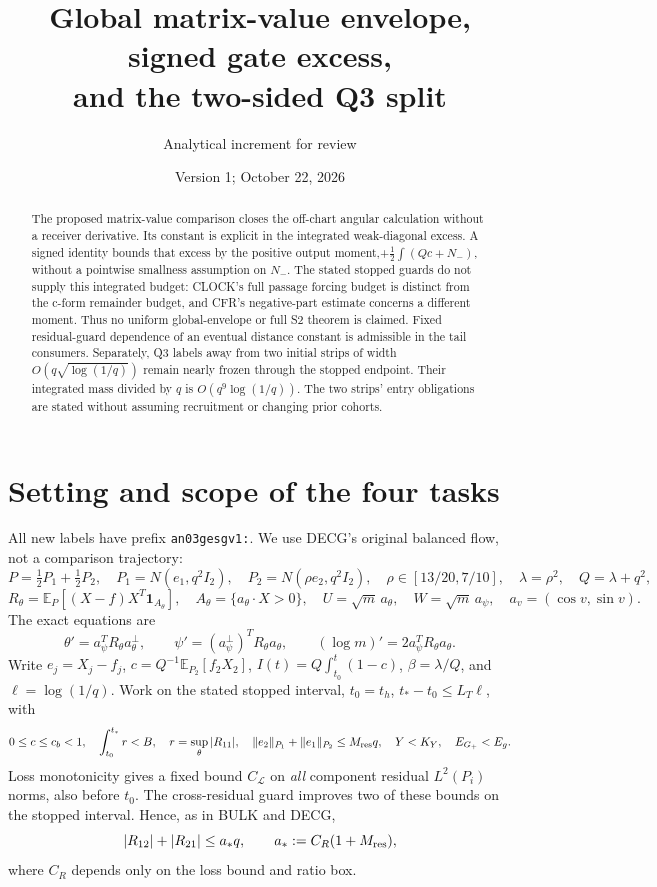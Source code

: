 \documentclass[11pt]{article}
\title{Global matrix-value envelope, signed gate excess,\\
and the two-sided Q3 split}
\author{Analytical increment for review}
\date{Version 1; October 22, 2026}
\theoremstyle{remark}\newtheorem{remark}[proposition]{Remark}
\newcommand{\E}{\mathbb E}
\newcommand{\one}{\mathbf1}
\newcommand{\Gp}{G_+}
\begin{document}
\maketitle
\begin{abstract}
The proposed matrix-value comparison closes the off-chart
angular calculation without a receiver derivative. Its constant
is explicit in the integrated weak-diagonal excess. A signed
identity bounds that excess by the positive output moment,+$\frac12\int(Qc+N_-)$, without a pointwise smallness assumption
on $N_-$. The stated stopped guards do not supply this integrated
budget: CLOCK's full passage forcing budget is distinct from
the c-form remainder budget, and CFR's negative-part estimate
concerns a different moment. Thus no uniform global-envelope
or full S2 theorem is claimed. Fixed residual-guard dependence
of an eventual distance constant is admissible in the tail
consumers. Separately, Q3 labels away from two initial strips
of width $O(q\sqrt{\log(1/q)})$ remain nearly frozen through
the stopped endpoint. Their integrated mass divided by $q$
is $O(q^9\log(1/q))$. The two strips' entry obligations are
stated without assuming recruitment or changing prior cohorts.
\end{abstract}

\section{Setting and scope of the four tasks}
All new labels have prefix \texttt{an03gesgv1:}.
We use DECG's original balanced flow, not a comparison trajectory:
\[
 P=\tfrac12P_1+\tfrac12P_2,\quad
 P_1=N(e_1,q^2I_2),\quad P_2=N(\rho e_2,q^2I_2),\quad
 \rho\in[13/20,7/10],\quad \lambda=\rho^2,\quad Q=\lambda+q^2,
\]
\[
 R_\theta=\E_P[(X-f)X^T\one_{A_\theta}],\quad
 A_\theta=\{a_\theta\cdot X>0\},\quad
 U=\sqrt m\,a_\theta,\quad W=\sqrt m\,a_\psi,
 \quad a_v=(\cos v,\sin v).
\]
The exact equations are
\begin{equation}
 \theta'=a_\psi^TR_\theta a_\theta^\perp,\qquad
 \psi'=(a_\psi^\perp)^TR_\theta a_\theta,\qquad
 (\log m)'=2a_\psi^TR_\theta a_\theta.
 \label{an03gesgv1:exact}
\end{equation}
Write $e_j=X_j-f_j$, $c=Q^{-1}\E_{P_2}[f_2X_2]$,
$I(t)=Q\int_{t_0}^t(1-c)$, $\beta=\lambda/Q$, and
$\ell=\log(1/q)$. Work on the stated stopped interval,
$t_0=t_h$, $t_*-t_0\le L_T\ell$, with
\begin{equation}
 0\le c\le c_b<1,\quad \int_{t_0}^{t_*}r<B,\quad
 r=\sup_\theta|R_{11}|,\quad
 \|e_2\|_{P_1}+\|e_1\|_{P_2}\le M_{\rm res}q,
 \quad Y<K_Y,\quad E_{\Gp}<E_g.
 \label{an03gesgv1:guards}
\end{equation}
Loss monotonicity gives a fixed bound $C_{\mathcal L}$ on
\emph{all} component residual $L^2(P_i)$ norms, also before
$t_0$. The cross-residual guard improves two of these bounds
on the stopped interval. Hence, as in BULK and DECG,
\begin{equation}
 |R_{12}|+|R_{21}|\le a_*q,\qquad
 a_*:=C_R(1+M_{\rm res}),
 \label{an03gesgv1:cross}
\end{equation}
where $C_R$ depends only on the loss bound and ratio box.
\end{document}
